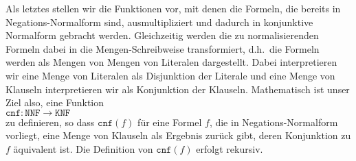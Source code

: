 Als letztes stellen wir die Funktionen vor, mit denen die Formeln, die bereits in
Negations-Normalform sind, ausmultipliziert und dadurch in konjunktive
Normalform gebracht werden.  Gleichzeitig werden  die zu normalisierenden Formeln dabei
in die Mengen-Schreibweise transformiert, d.h.~die Formeln werden als Mengen von Mengen 
von Literalen dargestellt.  Dabei interpretieren wir eine Menge von Literalen als
Disjunktion der Literale und eine Menge von Klauseln interpretieren wir als Konjunktion
der Klauseln.  Mathematisch ist unser Ziel also, eine Funktion
\\[0.2cm]
\hspace*{1.3cm}
$\texttt{cnf}: \texttt{NNF} \rightarrow \texttt{KNF}$
\\[0.2cm]
zu definieren, so dass $\texttt{cnf}(f)$ für eine Formel $f$, die in Negations-Normalform vorliegt, eine Menge von Klauseln als
Ergebnis zurück gibt, deren Konjunktion zu $f$ äquivalent ist.  Die Definition von $\texttt{cnf}(f)$ erfolgt
rekursiv.
